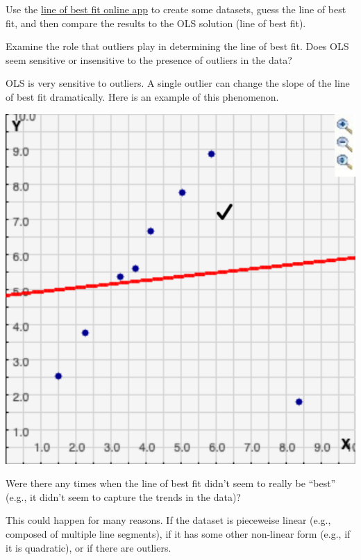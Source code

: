 \documentclass[assignment01_Solutions]{subfiles}
\begin{document}
\begin{externalresources}
Use the \href{http://www.shodor.org/interactivate/activities/Regression/}{line of best fit online app} to create some datasets, guess the line of best fit, and then compare the results to the OLS solution (line of best fit).

\begin{exercise}
\bes
\item Examine the role that outliers play in determining the line of best fit.  Does OLS seem sensitive or insensitive to the presence of outliers in the data?
\begin{boxedsolution}
OLS is very sensitive to outliers.  A single outlier can change the slope of the line of best fit dramatically.  Here is an example of this phenomenon.

\begin{center}
\includegraphics[width=.6\linewidth]{figures/outlier}
\end{center}

\end{boxedsolution}

\item Were there any times when the line of best fit didn't seem to really be ``best'' (e.g., it didn't seem to capture the trends in the data)?
\begin{boxedsolution}
This could happen for many reasons.  If the dataset is pieceweise linear (e.g., composed of multiple line segments), if it has some other non-linear form (e.g., if it is quadratic), or if there are outliers.
\end{boxedsolution}

\ees
\end{exercise}

\end{externalresources}
\end{document}
